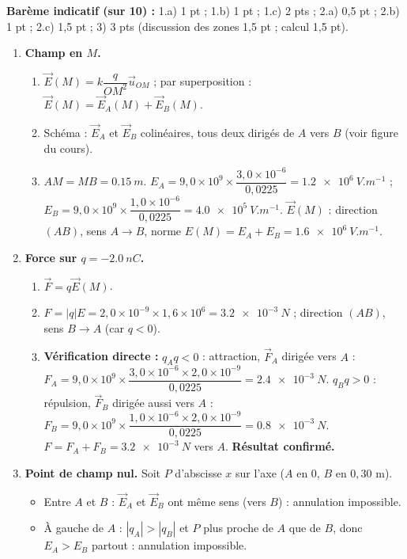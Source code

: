 \documentclass[11pt]{article}
\begin{document}
\begin{corrige}
\textbf{Barème indicatif (sur 10) :} 1.a) 1 pt ; 1.b) 1 pt ; 1.c) 2 pts ; 2.a) 0,5 pt ; 2.b) 1 pt ; 2.c) 1,5 pt ; 3) 3 pts (discussion des zones 1,5 pt ; calcul 1,5 pt).
\begin{enumerate}
\item \textbf{Champ en $M$.}
\begin{enumerate}
\item $\vec{E}(M) = k\dfrac{q}{OM^2}\vec{u}_{OM}$ ; par superposition : $\vec{E}(M) = \vec{E}_A(M) + \vec{E}_B(M)$.
\item Schéma : $\vec{E}_A$ et $\vec{E}_B$ colinéaires, tous deux dirigés de $A$ vers $B$ (voir figure du cours).
\item $AM = MB = \SI{0,15}{m}$.
$E_A = 9,0\times 10^{9}\times\dfrac{3,0\times 10^{-6}}{0,0225} = \SI{1,2e6}{V.m^{-1}}$ ; $E_B = 9,0\times 10^{9}\times\dfrac{1,0\times 10^{-6}}{0,0225} = \SI{4,0e5}{V.m^{-1}}$.
$\vec{E}(M)$ : direction $(AB)$, sens $A\to B$, norme $E(M) = E_A + E_B = \SI{1,6e6}{V.m^{-1}}$.
\end{enumerate}
\item \textbf{Force sur $q = -\SI{2,0}{nC}$.}
\begin{enumerate}
\item $\vec{F} = q\vec{E}(M)$.
\item $F = |q|E = 2,0\times 10^{-9}\times 1,6\times 10^{6} = \SI{3,2e-3}{N}$ ; direction $(AB)$, sens $B \to A$ (car $q<0$).
\item \textbf{Vérification directe :} $q_A q < 0$ : attraction, $\vec{F}_A$ dirigée vers $A$ :
$F_A = 9,0\times 10^{9}\times\dfrac{3,0\times 10^{-6}\times 2,0\times 10^{-9}}{0,0225} = \SI{2,4e-3}{N}$.
$q_B q > 0$ : répulsion, $\vec{F}_B$ dirigée aussi vers $A$ :
$F_B = 9,0\times 10^{9}\times\dfrac{1,0\times 10^{-6}\times 2,0\times 10^{-9}}{0,0225} = \SI{0,8e-3}{N}$.
$F = F_A + F_B = \SI{3,2e-3}{N}$ vers $A$. \textbf{Résultat confirmé.}
\end{enumerate}
\item \textbf{Point de champ nul.} Soit $P$ d'abscisse $x$ sur l'axe ($A$ en $0$, $B$ en $0,30$ m).
\begin{itemize}
\item Entre $A$ et $B$ : $\vec{E}_A$ et $\vec{E}_B$ ont même sens (vers $B$) : annulation impossible.
\item À gauche de $A$ : $|q_A| > |q_B|$ et $P$ plus proche de $A$ que de $B$, donc $E_A > E_B$ partout : annulation impossible.

\end{itemize}
\end{enumerate}
\end{corrige}
\end{document}
